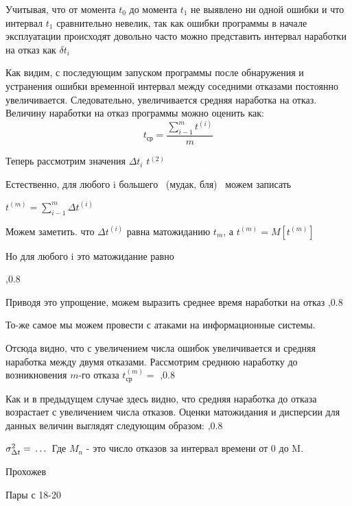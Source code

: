 \documentclass[a4paper, 12pt]{extarticle}
\begin{document}
	Учитывая, что от момента $t_0$ до момента $t_1$ не выявлено ни одной ошибки и что интервал $t_1$ сравнительно невелик, так как ошибки программы в начале эксплуатации происходят довольно часто можно представить интервал наработки на отказ как $\delta t_i$

	Как видим, с последующим запуском программы после обнаружения и устранения ошибки временной интервал между соседними отказами постоянно увеличивается. Следовательно, увеличивается средняя наработка на отказ. Величину наработки на отказ программы можно оценить как:
	$$t_{\mbox{ср}} = \frac{\sum\limits_{i-1}^m t^{(i)}}{m}$$

	Теперь рассмотрим значения $\Delta t_i$
	$t^{(2)}$

	Естественно, для любого i большего ~(мудак, бля)~ можем записать

	$t^{(m)} = \sum\limits_{i-1}^m \Delta t^{(i)}$

	Можем заметить. что $\Delta t^{(i)}$ равна матожиданию $t_m$, а
	$t^{(m)}=M[t^{(m)}]$

	Но для любого i это матожидание равно

	,0.8

	Приводя это упрощение, можем выразить среднее время наработки на отказ
	,0.8

	То-же самое мы можем провести с атаками на информационные системы.

	Отсюда видно, что с увеличением числа ошибок увеличивается и средняя наработка между двумя отказами. Рассмотрим среднюю наработку до возникновения $m$-го отказа
	$t^{(m)}_{\mbox{ср}} = $
	,0.8

	Как и в предыдущем случае здесь видно, что средняя наработка до отказа возрастает с увеличением числа отказов.  Оценки матожидания и дисперсии для данных величин выглядят следующим образом:
	,0.8

	$\- \sigma^2_{\Delta t} = \,\ldots\,$
	 Где $M_n$ - это число отказов за интервал времени от 0 до M.









	 Прохожев

	 Пары с 18-20
\end{document}
